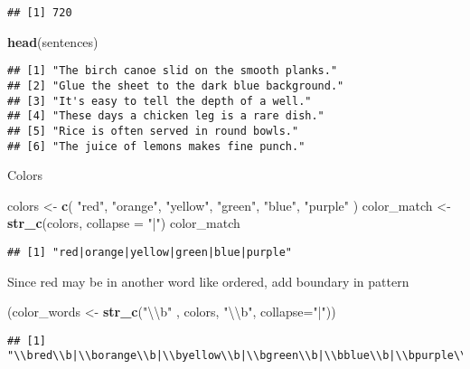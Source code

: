 \documentclass[
]{article}
\newenvironment{Shaded}{\begin{snugshade}}{\end{snugshade}}
\newcommand{\CharTok}[1]{\textcolor[rgb]{0.31,0.60,0.02}{#1}}
\newcommand{\DataTypeTok}[1]{\textcolor[rgb]{0.13,0.29,0.53}{#1}}
\newcommand{\KeywordTok}[1]{\textcolor[rgb]{0.13,0.29,0.53}{\textbf{#1}}}
\newcommand{\NormalTok}[1]{#1}
\newcommand{\StringTok}[1]{\textcolor[rgb]{0.31,0.60,0.02}{#1}}
\begin{document}
\begin{verbatim}
## [1] 720
\end{verbatim}

\begin{Shaded}
\begin{Highlighting}[]
\KeywordTok{head}\NormalTok{(sentences)}
\end{Highlighting}
\end{Shaded}

\begin{verbatim}
## [1] "The birch canoe slid on the smooth planks." 
## [2] "Glue the sheet to the dark blue background."
## [3] "It's easy to tell the depth of a well."     
## [4] "These days a chicken leg is a rare dish."   
## [5] "Rice is often served in round bowls."       
## [6] "The juice of lemons makes fine punch."
\end{verbatim}

Colors

\begin{Shaded}
\begin{Highlighting}[]
\NormalTok{colors \textless{}{-}}\StringTok{ }\KeywordTok{c}\NormalTok{(}
\StringTok{"red"}\NormalTok{, }\StringTok{"orange"}\NormalTok{, }\StringTok{"yellow"}\NormalTok{, }\StringTok{"green"}\NormalTok{, }\StringTok{"blue"}\NormalTok{, }\StringTok{"purple"}
\NormalTok{)}
\NormalTok{color\_match \textless{}{-}}\StringTok{ }\KeywordTok{str\_c}\NormalTok{(colors, }\DataTypeTok{collapse =} \StringTok{"|"}\NormalTok{)}
\NormalTok{color\_match}
\end{Highlighting}
\end{Shaded}

\begin{verbatim}
## [1] "red|orange|yellow|green|blue|purple"
\end{verbatim}

Since red may be in another word like ordered, add boundary in pattern

\begin{Shaded}
\begin{Highlighting}[]
\NormalTok{(color\_words \textless{}{-}}\StringTok{ }\KeywordTok{str\_c}\NormalTok{(}\StringTok{"}\CharTok{\textbackslash{}\textbackslash{}}\StringTok{b"}\NormalTok{ , colors, }\StringTok{"}\CharTok{\textbackslash{}\textbackslash{}}\StringTok{b"}\NormalTok{, }\DataTypeTok{collapse=}\StringTok{"|"}\NormalTok{))}
\end{Highlighting}
\end{Shaded}

\begin{verbatim}
## [1] "\\bred\\b|\\borange\\b|\\byellow\\b|\\bgreen\\b|\\bblue\\b|\\bpurple\\b"
\end{verbatim}
\end{document}
